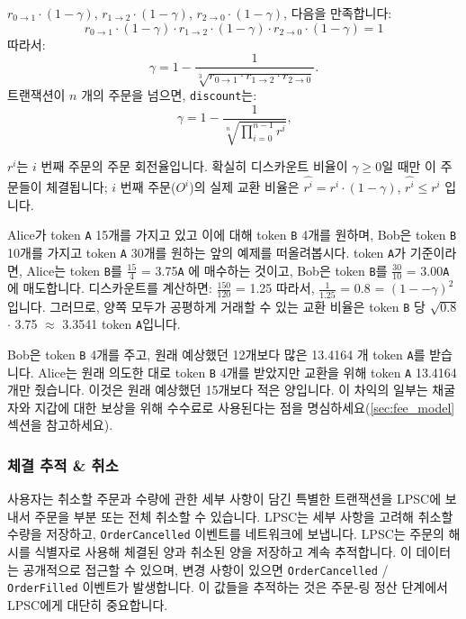 \documentclass[UTF8,nofonts]{article}
\begin{document}
\begin{multicols}{2}
$r_{0\rightarrow 1} \cdot (1-\gamma)$, $r_{1\rightarrow 2} \cdot (1-\gamma)$, $r_{2 \rightarrow 0} \cdot (1-\gamma)$, 
다음을 만족합니다: 
\begin{equation}
r_{0\rightarrow 1} \cdot (1-\gamma)\cdot r_{1\rightarrow 2} \cdot (1-\gamma) \cdot r_{2 \rightarrow 0} \cdot (1-\gamma) = 1
\end{equation}
따라서: 
\begin{equation}
\gamma = 1- \frac{1}{\sqrt[3]{r_{0\rightarrow 1} \cdot r_{1\rightarrow 2} \cdot r_{2\rightarrow 0}}}\text{.}
\end{equation}
트랜잭션이 $n$ 개의 주문을 넘으면, \texttt{discount}는: 
\begin{equation}
\gamma = 1- \frac{1}{\sqrt[n]{\prod_{i=0}^{n-1} r^i}} \text{,}
\end{equation}

$r^i$는 $i$ 번째 주문의 주문 회전율입니다. 확실히 디스카운트 비율이 $\gamma \ge 0$일 때만 이 주문들이 체결됩니다; $i$ 번째 주문($O^i$)의 실제 교환 비율은 $\hat{r^i} = r^i \cdot (1-\gamma)$, $\hat{r^i}\le r^i$ 입니다. 

Alice가 token \verb|A| 15개를 가지고 있고 이에 대해 token \verb|B| 4개를 원하며, Bob은 token \verb|B| 10개를 가지고 token \verb|A| 30개를 원하는 앞의 예제를 떠올려봅시다. token \verb|A|가 기준이라면, Alice는 token \verb|B|를 $\frac{15}{4}$ = 3.75\verb|A| 에 매수하는 것이고, Bob은 token \verb|B|를 $\frac{30}{10}$ = 3.00\verb|A|에 매도합니다. 디스카운트를 계산하면: $\frac{150}{120}$ = 1.25 따라서, $\frac{1}{1.25}$ = 0.8 = $(1 −- \gamma)^2$ 입니다. 그러므로, 양쪽 모두가 공평하게 거래할 수 있는 교환 비율은 token \verb|B| 당 $\sqrt{0.8}$ $\cdot$ 3.75 $\approx$ 3.3541 token \verb|A|입니다.

Bob은 token \verb|B| 4개를 주고, 원래 예상했던 12개보다 많은 13.4164 개 token \verb|A|를 받습니다. Alice는 원래 의도한 대로 token \verb|B| 4개를 받았지만 교환을 위해 token \verb|A| 13.4164개만 줬습니다. 이것은 원래 예상했던 15개보다 적은 양입니다.  
이 차익의 일부는 채굴자와 지갑에 대한 보상을 위해 수수료로 사용된다는 점을 명심하세요(\ref{sec:fee_model} 섹션을 참고하세요).


\subsubsection{체결 추적 \& 취소}
사용자는 취소할 주문과 수량에 관한 세부 사항이 담긴 특별한 트랜잭션을 LPSC에 보내서 주문을 부분 또는 전체 취소할 수 있습니다. LPSC는 세부 사항을 고려해 취소할 수량을 저장하고, \verb|OrderCancelled| 이벤트를 네트워크에 보냅니다. LPSC는 주문의 해시를 식별자로 사용해 체결된 양과 취소된 양을 저장하고 계속 추적합니다. 이 데이터는 공개적으로 접근할 수 있으며, 변경 사항이 있으면 \verb|OrderCancelled| / \verb|OrderFilled| 이벤트가 발생합니다.
이 값들을 추적하는 것은 주문-링 정산 단계에서 LPSC에게 대단히 중요합니다.


\end{multicols}
\end{document}
